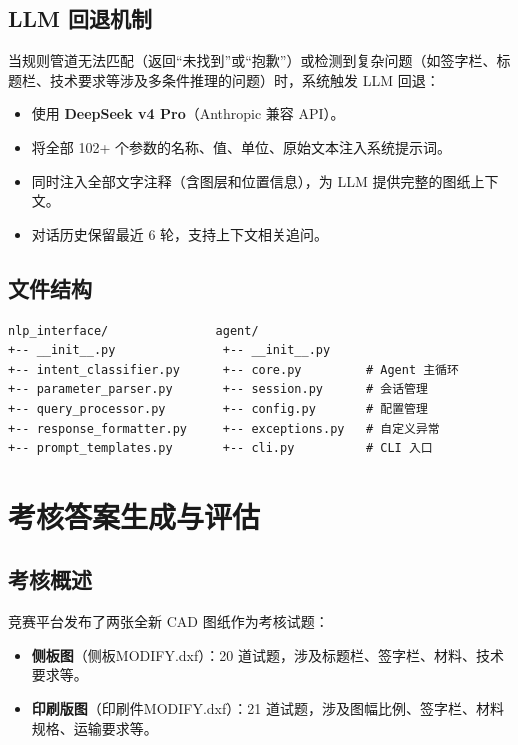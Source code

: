 \documentclass[11pt,a4paper]{article}
\begin{document}
\subsection{LLM 回退机制}

当规则管道无法匹配（返回“未找到”或“抱歉”）或检测到复杂问题（如签字栏、标题栏、技术要求等涉及多条件推理的问题）时，系统触发 LLM 回退：

\begin{itemize}[nosep]
  \item 使用 \textbf{DeepSeek v4 Pro}（Anthropic 兼容 API）。
  \item 将全部 102+ 个参数的名称、值、单位、原始文本注入系统提示词。
  \item 同时注入全部文字注释（含图层和位置信息），为 LLM 提供完整的图纸上下文。
  \item 对话历史保留最近 6 轮，支持上下文相关追问。
\end{itemize}

\subsection{文件结构}

\begin{lstlisting}[language={},frame=single]
nlp_interface/               agent/
+-- __init__.py               +-- __init__.py
+-- intent_classifier.py      +-- core.py         # Agent 主循环
+-- parameter_parser.py       +-- session.py      # 会话管理
+-- query_processor.py        +-- config.py       # 配置管理
+-- response_formatter.py     +-- exceptions.py   # 自定义异常
+-- prompt_templates.py       +-- cli.py          # CLI 入口
\end{lstlisting}

\section{考核答案生成与评估}

\subsection{考核概述}

竞赛平台发布了两张全新 CAD 图纸作为考核试题：

\begin{itemize}[nosep]
  \item \textbf{侧板图}（侧板MODIFY.dxf）：20 道试题，涉及标题栏、签字栏、材料、技术要求等。
  \item \textbf{印刷版图}（印刷件MODIFY.dxf）：21 道试题，涉及图幅比例、签字栏、材料规格、运输要求等。
\end{itemize}
\end{document}
